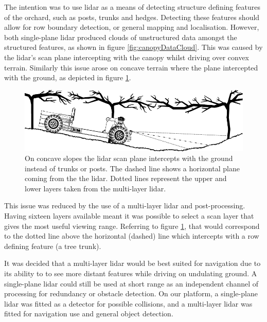 \documentclass[preprint,authoryear,12pt]{elsarticle}
\begin{document}
        The intention was to use lidar as a means of detecting structure defining features of the orchard, such as posts, trunks and hedges.
        Detecting these features should allow for row boundary detection, or general mapping and localisation.
        However, both single-plane lidar produced clouds of unstructured data amongst the structured features, as shown in figure \ref{fig:canopyDataCloud}.
        This was caused by the lidar's scan plane intercepting with the canopy whilst driving over convex terrain.
        Similarly this issue arose on concave terrain where the plane intercepted with the ground, as depicted in figure \ref{fig:concaveSlope}.

        \begin{figure}[htb]
            \centering
            \includegraphics[width=\linewidth]{imgs/concave_slope/concave_slope_v4.pdf}
            \caption{
                On concave slopes the lidar scan plane intercepts with the ground instead of trunks or posts.
                The dashed line shows a horizontal plane coming from the the lidar.
                Dotted lines represent the upper and lower layers taken from the multi-layer lidar.
            }
            \label{fig:concaveSlope}
        \end{figure}

        This issue was reduced by the use of a multi-layer lidar and post-processing.
        Having sixteen layers available meant it was possible to select a scan layer that gives the most useful viewing range.
        Referring to figure \ref{fig:concaveSlope}, that would correspond to the dotted line above the horizontal (dashed) line which intercepts with a row defining feature (a tree trunk).

        It was decided that a multi-layer lidar would be best suited for navigation due to its ability to to see more distant features while driving on undulating ground.
        A single-plane lidar could still be used at short range as an independent channel of processing for redundancy or obstacle detection.
        On our platform, a single-plane lidar was fitted as a detector for possible collisions, and a multi-layer lidar was fitted for navigation use and general object detection.
\end{document}
